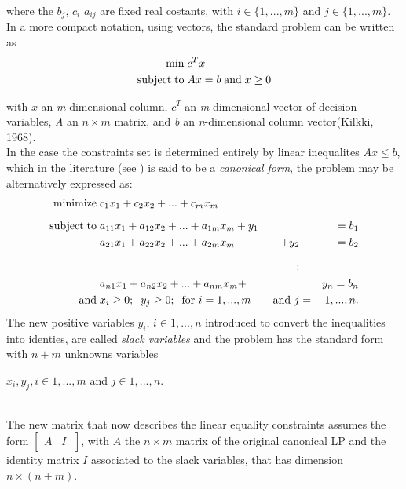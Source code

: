 \documentclass[a4paper,10 pt,titlepage,twoside]{book}
\theoremstyle{plain}
\theoremstyle{definition}
\theoremstyle{remark}
\begin{document}
where the $b_{j}$, $c_{i}$  $a_{ij}$ are fixed real costants, with $i \in\{1,...,m\}$ and $j\in\{1,...,m\}$.\\ In a more compact notation, using vectors, the standard problem can be written as
\begin{equation}\label{Prim}
 \begin{split}
\min\; &c^{T}x\\
\text{subject\;to\;}&Ax = b\;\text{and\;}x\geq0
 \end{split}
\end{equation}

with $x$ an \textit{m}-dimensional column, $c^
{T}$ an \textit{m}-dimensional vector of decision variables, \textit{A} an $n \times m$ matrix, and \textit{b} an \textit{n}-dimensional column vector(Kilkki, 1968).\\
In the case the constraints set is determined entirely by linear inequalites $Ax \leq b$, which in the literature (see \cite{W}) is said to be a \textit{canonical form}, the problem may be alternatively expressed as:
\begin{alignat*}{3}
\text{minimize\;}&c_1 x_1 + c_2 x_2+ ...+c_m x_m&&&\\[2mm]
\text{subject\;to\;}&a_{11} x_1 +a_{12}x_2 + ... +a_{1m}x_m +y_{1}&&&= b_1\\
		   	&a_{21}x_1+a_{22}x_2+ ... +a_{2m}x_m&+y_{2}&&= b_2\\
&&\;\;\;\vdots&&\\
&a_{n1}x_1+a_{n2}x_2+ ... +a_{nm}x_m+&&&y_{n}=b_n\\
\text{and} \;& x_{i} \geq 0;\;\; y_{j} \geq 0; \text{\;\;for }i = 1,...,m&\text{ and }j&=&1,...,n.
\end{alignat*}
The new positive variables $\mathit{y_{i}}$, $i \in {1, ..., n}$ introduced to convert the inequalities into identies, are called \textit{slack variables} and the problem has the standard form with $n+m$ unknowns variables \begin{itshape}$x_{i}, y_{j},i \in {1, ..., m}$ and $j \in {1, ..., n}.$\end{itshape}\\ The new matrix that now describes the linear equality constraints assumes the form $\left[\begin{matrix}A\;\vert\; I\;\end{matrix}\right]$, with $A$ the $n \times m$ matrix of the original canonical LP and the identity matrix $I$ associated to the slack variables, that has dimension $n \times (n + m)$.\\
\end{document}
